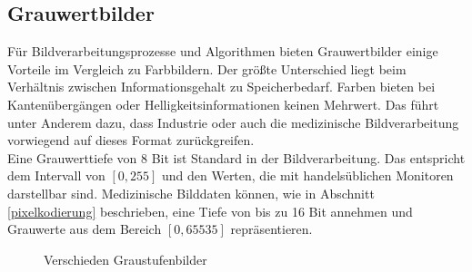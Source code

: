 \subsection{Grauwertbilder} \label{grey_images}

Für Bildverarbeitungsprozesse und Algorithmen bieten Grauwertbilder einige Vorteile im Vergleich zu Farbbildern. Der größte Unterschied liegt beim Verhältnis zwischen Informationsgehalt zu Speicherbedarf. Farben bieten bei Kantenübergängen oder Helligkeitsinformationen keinen Mehrwert. Das führt unter Anderem dazu, dass Industrie oder auch die medizinische Bildverarbeitung vorwiegend auf dieses Format zurückgreifen.\\
Eine Grauwerttiefe von 8 Bit ist Standard in der Bildverarbeitung. Das entspricht dem Intervall von $[0,255]$ und den Werten, die mit handelsüblichen Monitoren darstellbar sind. Medizinische Bilddaten können, wie in Abschnitt \ref{pixelkodierung} beschrieben, eine Tiefe von bis zu 16 Bit annehmen und Grauwerte aus dem Bereich $[0,65535]$ repräsentieren.

\begin{figure}[htb]
\centering
{}
\caption{Verschieden Graustufenbilder}
\label{grey}
\end{figure}

